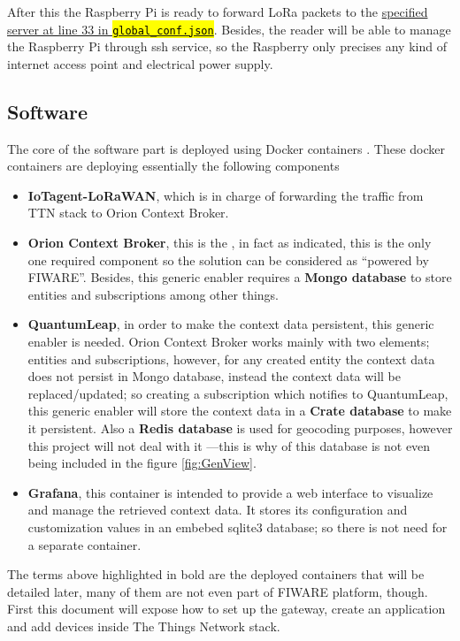 \documentclass[11pt,a4paper,dvipsnames,twoside]{article}
\newcommand{\myuline}[1]{%
  \uline{\phantom{#1}}%
  \llap{\contour{white}{#1}}%
}
\newcommand{\cmd}[1] {\hl{\texttt{#1}}}
\begin{document}
After this the Raspberry Pi is ready to forward LoRa packets to the \href{https://github.com/dragino/dual_chan_pkt_fwd/blob/master/global_conf.json#L33}{specified server at line 33 in \cmd{global\_conf.json}}. Besides, the reader will be able to manage the Raspberry Pi through ssh service, so the Raspberry only precises any kind of internet access point and electrical power supply.

\subsection{Software}

The core of the software part is deployed using Docker containers \cite{Docker_container}. These docker containers are deploying essentially the following components

\begin{itemize}
  \item \textbf{IoTagent-LoRaWAN}, which is in charge of forwarding the traffic from TTN stack to Orion Context Broker.
  \item \textbf{Orion Context Broker}, this is the \myuline{core generic enabler}, in fact as indicated, this is the only one required component so the solution can be considered as \enquote{powered by FIWARE}. Besides, this generic enabler requires a \textbf{Mongo database} to store entities and subscriptions among other things. 
  \item \textbf{QuantumLeap}, in order to make the context data persistent, this generic enabler is needed. Orion Context Broker works mainly with two elements; entities and subscriptions, however, for any created entity the context data does not persist in Mongo database, instead the context data will be replaced/updated; so creating a subscription which notifies to QuantumLeap, this generic enabler will store the context data in a \textbf{Crate database} to make it persistent. Also a \textbf{Redis database} is used for geocoding purposes, however this project will not deal with it ---this is why of this database is not even being included in the figure \ref{fig:GenView}.
  \item \textbf{Grafana}, this container is intended to provide a web interface to visualize and manage the retrieved context data. It stores its configuration and customization values in an embebed sqlite3 database; so there is not need for a separate container. 
\end{itemize}

The terms above highlighted in bold are the deployed containers that will be detailed later, many of them are not even part of FIWARE platform, though. First this document will expose how to set up the gateway, create an application and add devices inside The Things Network stack. 
\end{document}
